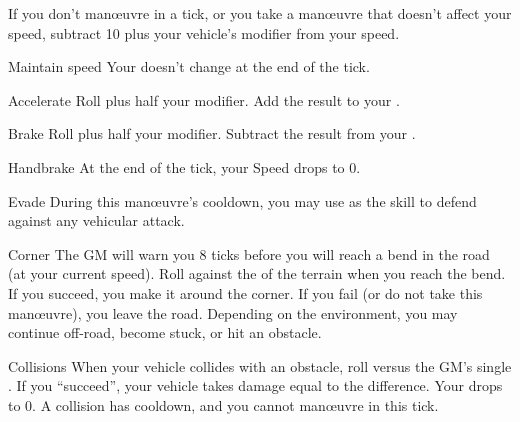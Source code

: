 
If you don't man\oe{}uvre in a tick, or you take a man\oe{}uvre that doesn't affect your speed, subtract 10 plus your vehicle's  modifier from your speed.

\begin{describe}{Maintain speed}
  Your  doesn't change at the end of the tick.
\end{describe}

\begin{describe}{Accelerate}
  Roll  plus half your  modifier. Add the result to your .
\end{describe}

\begin{describe}{Brake}
  Roll  plus half your  modifier. Subtract the result from your .
\end{describe}

\begin{describe}{Handbrake}
  At the end of the tick, your Speed drops to 0.
\end{describe}

\begin{describe}{Evade}
  During this man\oe{}uvre's cooldown, you may use  as the skill to defend against any vehicular attack.
\end{describe}

\begin{describe}{Corner}
  The GM will warn you 8 ticks before you will reach a bend in the road (at your current speed). Roll  against the  of the terrain when you reach the bend. If you succeed, you make it around the corner. If you fail (or do not take this man\oe{}uvre), you leave the road. Depending on the environment, you may continue off-road, become stuck, or hit an obstacle.
\end{describe}

\begin{abstractsection}{Collisions}
  When your vehicle collides with an obstacle, roll  versus the GM's single . If you ``succeed'', your vehicle takes damage equal to the difference. Your  drops to 0. A collision has  cooldown, and you cannot man\oe{}uvre in this tick.
\end{abstractsection}
